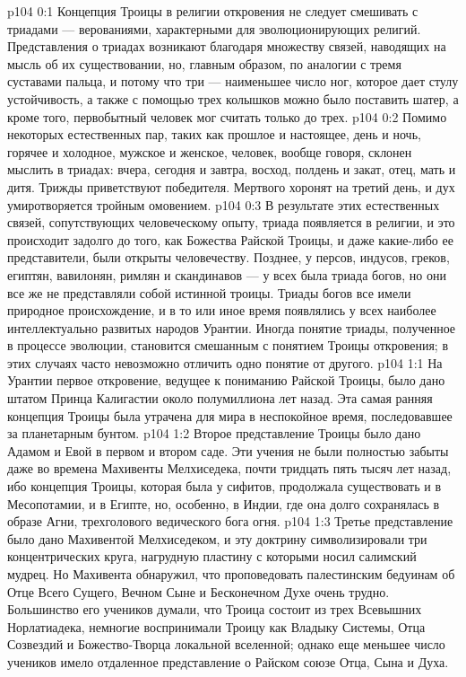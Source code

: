 \author{Мелхиседек}
\vs p104 0:1 Концепция Троицы в религии откровения не следует смешивать с триадами --- верованиями, характерными для эволюционирующих религий. Представления о триадах возникают благодаря множеству связей, наводящих на мысль об их существовании, но, главным образом, по аналогии с тремя суставами пальца, и потому что три --- наименьшее число ног, которое дает стулу устойчивость, а также с помощью трех колышков можно было поставить шатер, а кроме того, первобытный человек мог считать только до трех.
\vs p104 0:2 Помимо некоторых естественных пар, таких как прошлое и настоящее, день и ночь, горячее и холодное, мужское и женское, человек, вообще говоря, склонен мыслить в триадах: вчера, сегодня и завтра, восход, полдень и закат, отец, мать и дитя. Трижды приветствуют победителя. Мертвого хоронят на третий день, и дух умиротворяется тройным омовением.
\vs p104 0:3 В результате этих естественных связей, сопутствующих человеческому опыту, триада появляется в религии, и это происходит задолго до того, как Божества Райской Троицы, и даже какие\hyp{}либо ее представители, были открыты человечеству. Позднее, у персов, индусов, греков, египтян, вавилонян, римлян и скандинавов --- у всех была триада богов, но они все же не представляли собой истинной троицы. Триады богов все имели природное происхождение, и в то или иное время появлялись у всех наиболее интеллектуально развитых народов Урантии. Иногда понятие триады, полученное в процессе эволюции, становится смешанным с понятием Троицы откровения; в этих случаях часто невозможно отличить одно понятие от другого.
\vs p104 1:1 На Урантии первое откровение, ведущее к пониманию Райской Троицы, было дано штатом Принца Калигастии около полумиллиона лет назад. Эта самая ранняя концепция Троицы была утрачена для мира в неспокойное время, последовавшее за планетарным бунтом.
\vs p104 1:2 Второе представление Троицы было дано Адамом и Евой в первом и втором саде. Эти учения не были полностью забыты даже во времена Махивенты Мелхиседека, почти тридцать пять тысяч лет назад, ибо концепция Троицы, которая была у сифитов, продолжала существовать и в Месопотамии, и в Египте, но, особенно, в Индии, где она долго сохранялась в образе Агни, трехголового ведического бога огня.
\vs p104 1:3 Третье представление было дано Махивентой Мелхиседеком, и эту доктрину символизировали три концентрических круга, нагрудную пластину с которыми носил салимский мудрец. Но Махивента обнаружил, что проповедовать палестинским бедуинам об Отце Всего Сущего, Вечном Сыне и Бесконечном Духе очень трудно. Большинство его учеников думали, что Троица состоит из трех Всевышних Норлатиадека, немногие воспринимали Троицу как Владыку Системы, Отца Созвездий и Божество\hyp{}Творца локальной вселенной; однако еще меньшее число учеников имело отдаленное представление о Райском союзе Отца, Сына и Духа.
